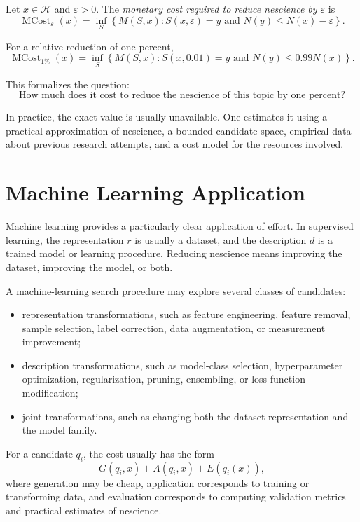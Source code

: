 \begin{definition}
Let \(x\in\mathcal{H}\) and \(\varepsilon>0\). The \emph{monetary cost required to reduce nescience by \(\varepsilon\)} is
\[
\operatorname{MCost}_{\varepsilon}(x)
=
\inf_S
\left\{
M(S,x):
S(x,\varepsilon)=y
\text{ and }
N(y)\leq N(x)-\varepsilon
\right\}.
\]
\end{definition}

For a relative reduction of one percent,
\[
\operatorname{MCost}_{1\%}(x)
=
\inf_S
\left\{
M(S,x):
S(x,0.01)=y
\text{ and }
N(y)\leq 0.99N(x)
\right\}.
\]

This formalizes the question:
\[
\text{How much does it cost to reduce the nescience of this topic by one percent?}
\]

In practice, the exact value is usually unavailable. One estimates it using a practical approximation of nescience, a bounded candidate space, empirical data about previous research attempts, and a cost model for the resources involved.

\section{Machine Learning Application}
\label{sec:effort_machine_learning}

Machine learning provides a particularly clear application of effort. In supervised learning, the representation \(r\) is usually a dataset, and the description \(d\) is a trained model or learning procedure. Reducing nescience means improving the dataset, improving the model, or both.

A machine-learning search procedure may explore several classes of candidates:
\begin{itemize}
    \item representation transformations, such as feature engineering, feature removal, sample selection, label correction, data augmentation, or measurement improvement;
    \item description transformations, such as model-class selection, hyperparameter optimization, regularization, pruning, ensembling, or loss-function modification;
    \item joint transformations, such as changing both the dataset representation and the model family.
\end{itemize}

For a candidate \(q_i\), the cost usually has the form
\[
G(q_i,x)+A(q_i,x)+E(q_i(x)),
\]
where generation may be cheap, application corresponds to training or transforming data, and evaluation corresponds to computing validation metrics and practical estimates of nescience.

